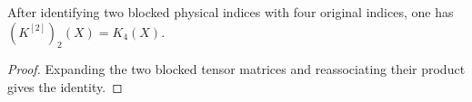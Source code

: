 \begin{lemma}
    \label{thm:mpdo_two_site_closure_two_site_blocking}
    \leanok
    After identifying two blocked physical indices with four original
    indices, one has $(K^{[2]})_2(X)=K_4(X)$.
\end{lemma}

\begin{proof}\leanok
    Expanding the two blocked tensor matrices and reassociating their product
    gives the identity.
\end{proof}
